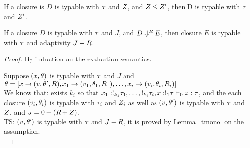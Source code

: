    \begin{lem}[TypableMono]
     \label{tmono}
     If a closure is $D$ is typable with $\tau$ and $Z$, and $Z \leq Z'$, then
     D is typable with $\tau$ and $Z'$.
    \end{lem} 

   
\begin{lem}[TypableSoundness]
  \label{tsound}
  If a closure $D$ is typable with $\tau$ and $J$, and $D \mathrel{\Downarrow^{R}} E$, then
    closure $E$ is typable with $\tau$ and adaptivity $J - R$. 
   \end{lem}

   \begin{proof}
     By induction on the evaluation semantics.\\


     Suppose $(x,\theta)$ is typable with $\tau$ and $J$ and $\theta = [x \to (v, \theta', R), x_1 \to (v_1, \theta_1, R_1) , \ldots ,  x_i \to (v_i, \theta_i, R_i) ]  $\\
     
     We know that: exists $k_i$ so that $ x_1 : !_{k_1} \tau_1, \ldots, !_{k_i} \tau_i,  x: !_{1} \tau \vdash_{0} x : \tau $,  and the each closure $ (v_i, \theta_i) $ is typable with $\tau_i$ and $Z_i$ as well as $(v, \theta')$ is typable with $\tau$ and $Z$.  and $J = 0 + (R + Z) $.\\

     TS: $(v, \theta') $ is typable with $\tau$ and $J - R$,  it is proved by Lemma~\ref{tmono} on the assumption.\\

   

\end{proof}

